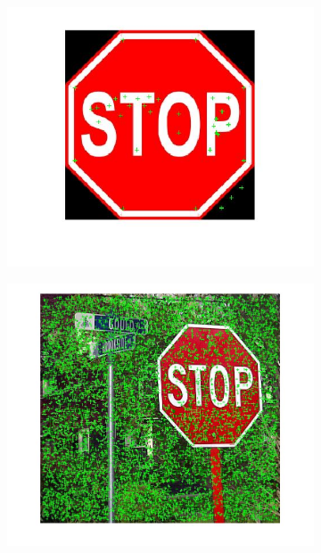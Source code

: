 \documentclass[a4paper]{iacas}
\begin{document}
\begin{figure}[!htbp]
	
	\begin{subfigure}[b]{0.23\textwidth}
		\includegraphics[width=\textwidth]{101.jpg}
		\caption{}
		\label{fig:101}
	\end{subfigure}
	\begin{subfigure}[b]{0.23\textwidth}
		\includegraphics[width=\textwidth]{102.jpg}
		\caption{}
		\label{fig:102}
	\end{subfigure}

\end{figure}
\end{document}
